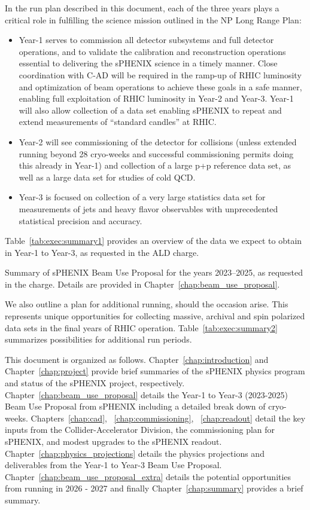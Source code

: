 In the run plan described in this document, each of the three years
plays a critical role in fulfilling the science mission outlined in
the NP Long Range Plan:
\begin{itemize}
\item Year-1 serves to commission all detector subsystems and full
  detector operations, and to validate the calibration and
  reconstruction operations essential to delivering the sPHENIX
  science in a timely manner. Close coordination with C-AD will be
  required in the ramp-up of RHIC luminosity and optimization of beam
  operations to achieve these goals in a safe manner, enabling full
  exploitation of RHIC luminosity in Year-2 and Year-3. Year-1 will
  also allow collection of a \auau data set enabling sPHENIX to repeat
  and extend measurements of ``standard candles'' at RHIC.
\item Year-2 will see commissioning of the detector for \pp collisions
  (unless extended running beyond 28 cryo-weeks and successful \auau
  commissioning permits doing this already in Year-1) and collection
  of a large p+p reference data set, as well as a large \pAu data set
  for studies of cold QCD.
\item Year-3 is focused on collection of a very large statistics \auau
  data set for measurements of jets and heavy flavor observables with
  unprecedented statistical precision and accuracy.
\end{itemize}

Table~\ref{tab:exec:summary1} provides an overview of the data we
expect to obtain in Year-1 to Year-3, as requested in the ALD charge.

\begin{table}[hbt!]
\centering
\caption{\label{tab:exec:summary1} Summary of sPHENIX Beam Use Proposal for the years
  2023--2025, as requested in the charge.  Details are provided in
  Chapter~\ref{chap:beam_use_proposal}.} 
\bigskip \centering 
\end{table}

We also outline a plan for additional running, should the occasion
arise. This represents unique opportunities for collecting massive,
archival \auau and spin polarized \pp data sets in the final years of
RHIC operation.  Table~\ref{tab:exec:summary2} summarizes possibilities for
additional run periods.

This document is organized as follows.    Chapter~\ref{chap:introduction} and Chapter~\ref{chap:project} provide brief summaries of the sPHENIX physics program and status of the sPHENIX project, respectively.    Chapter~\ref{chap:beam_use_proposal} details the Year-1 to Year-3 (2023-2025) Beam Use Proposal from sPHENIX including a detailed break down of cryo-weeks.    Chapters~\ref{chap:cad}, ~\ref{chap:commissioning}, ~\ref{chap:readout} detail the key inputs from the Collider-Accelerator Division, the commissioning plan for sPHENIX, and modest upgrades to the sPHENIX readout.    Chapter~\ref{chap:physics_projections} details the physics projections and deliverables from the Year-1 to Year-3 Beam Use Proposal.    Chapter~\ref{chap:beam_use_proposal_extra} details the potential opportunities from running in 2026 - 2027 and finally Chapter~\ref{chap:summary} provides a brief summary. 

